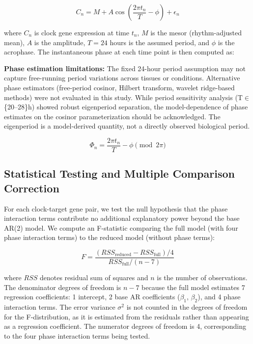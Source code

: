 \documentclass[11pt,a4paper]{article}
\begin{document}
\begin{equation}
C_n = M + A\cos\left(\frac{2\pi t_n}{T} - \phi\right) + \epsilon_n
\end{equation}

where $C_n$ is clock gene expression at time $t_n$, $M$ is the mesor (rhythm-adjusted mean), $A$ is the amplitude, $T=24$ hours is the assumed period, and $\phi$ is the acrophase. The instantaneous phase at each time point is then computed as:

\textbf{Phase estimation limitations:} The fixed 24-hour period assumption may not capture free-running period variations across tissues or conditions. Alternative phase estimators (free-period cosinor, Hilbert transform, wavelet ridge-based methods) were not evaluated in this study. While period sensitivity analysis (T$\in$\{20--28\}h) showed robust eigenperiod separation, the model-dependence of phase estimates on the cosinor parameterization should be acknowledged. The eigenperiod is a model-derived quantity, not a directly observed biological period.

\begin{equation}
\Phi_n = \frac{2\pi t_n}{T} - \phi \pmod{2\pi}
\end{equation}

\subsection{Statistical Testing and Multiple Comparison Correction}

For each clock-target gene pair, we test the null hypothesis that the phase interaction terms contribute no additional explanatory power beyond the base AR(2) model. We compute an F-statistic comparing the full model (with four phase interaction terms) to the reduced model (without phase terms):

\begin{equation}
F = \frac{(RSS_{\text{reduced}} - RSS_{\text{full}}) / 4}{RSS_{\text{full}} / (n - 7)}
\end{equation}

where $RSS$ denotes residual sum of squares and $n$ is the number of observations. The denominator degrees of freedom is $n-7$ because the full model estimates 7 regression coefficients: 1 intercept, 2 base AR coefficients ($\beta_1$, $\beta_2$), and 4 phase interaction terms. The error variance $\sigma^2$ is not counted in the degrees of freedom for the F-distribution, as it is estimated from the residuals rather than appearing as a regression coefficient. The numerator degrees of freedom is 4, corresponding to the four phase interaction terms being tested.
\end{document}
